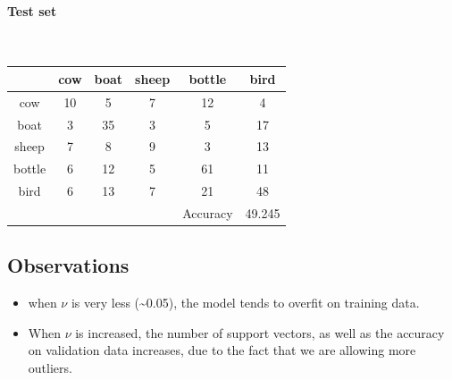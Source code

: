 \documentclass[fleqn]{article}
\newcommand{\myparagraph}[1]{\paragraph{#1}\mbox{}\\}
\begin{document}
\myparagraph{Test set}

\begin{center}
  \begin{longtable}{ c | c | c | c | c | c }
  	\multicolumn{1}{c}{} &
	\multicolumn{1}{c}{cow} & 
	\multicolumn{1}{c}{boat } & 
	\multicolumn{1}{c}{sheep } &
	\multicolumn{1}{c}{bottle } & 
	\multicolumn{1}{c}{bird } \\
    \hline
    cow       &  	10  &   5 	&  	7  	& 12 	& 4		\\\hline 
    boat      & 	3 	 & 	35 & 	3	& 5 	& 17		\\\hline
    sheep     &  	7  	& 	8  & 	9   & 3 	& 13\\\hline
    bottle    &  	6	& 	12 	& 	5	& 61 	& 11\\\hline
    bird      & 	6 	& 	13	&   7 	& 21	& 48\\\hline
              &        &      &        &   Accuracy 	& 49.245\\\hline
  \end{longtable}
\end{center}

\subsection{Observations}

\begin{itemize}
  \item when $\nu$ is very less (\textasciitilde0.05), the model tends to overfit on training data.
  \item When $\nu$ is increased, the number of support vectors, as well as the accuracy on validation data increases, due to the fact that we are allowing more outliers. 
\end{itemize}
\end{document}
